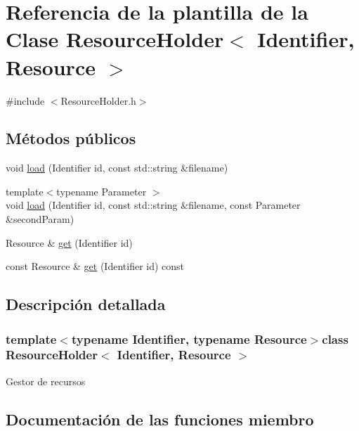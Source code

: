 \hypertarget{classResourceHolder}{}\section{Referencia de la plantilla de la Clase Resource\+Holder$<$ Identifier, Resource $>$}
\label{classResourceHolder}


{\ttfamily \#include $<$Resource\+Holder.\+h$>$}

\subsection*{Métodos públicos}
\begin{DoxyCompactItemize}
\item 
void \hyperlink{classResourceHolder_a4d48b233dc2abcebb9feb2b13dde79a6}{load} (Identifier id, const std\+::string \&filename)
\item 
{\footnotesize template$<$typename Parameter $>$ }\\void \hyperlink{classResourceHolder_a3cbeda6131f4a520fd7f9f1b86fdeea3}{load} (Identifier id, const std\+::string \&filename, const Parameter \&second\+Param)
\item 
Resource \& \hyperlink{classResourceHolder_a78d21eaeb968b17f8630e6f088ba07e8}{get} (Identifier id)
\item 
const Resource \& \hyperlink{classResourceHolder_aeb05b53a559ab743ab996553d9016ab0}{get} (Identifier id) const 
\end{DoxyCompactItemize}


\subsection{Descripción detallada}
\subsubsection*{template$<$typename Identifier, typename Resource$>$class Resource\+Holder$<$ Identifier, Resource $>$}

Gestor de recursos 

\subsection{Documentación de las funciones miembro}
\hypertarget{classResourceHolder_a78d21eaeb968b17f8630e6f088ba07e8}{}
